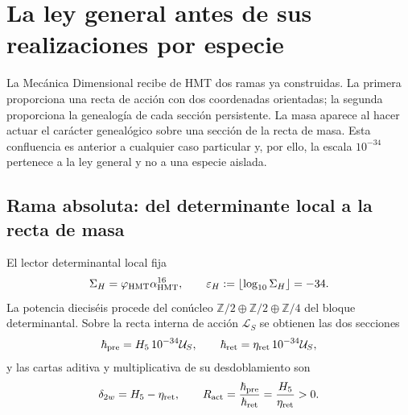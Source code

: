 \section{La ley general antes de sus realizaciones por especie}
\label{sec:ley-general-masa-accion-autonoma}

La Mecánica Dimensional recibe de HMT dos ramas ya construidas. La primera
proporciona una recta de acción con dos coordenadas orientadas; la segunda
proporciona la genealogía de cada sección persistente. La masa aparece al
hacer actuar el carácter genealógico sobre una sección de la recta de masa.
Esta confluencia es anterior a cualquier caso particular y, por ello, la
escala \(10^{-34}\) pertenece a la ley general y no a una especie aislada.

\subsection{Rama absoluta: del determinante local a la recta de masa}

El lector determinantal local fija
\begin{equation}
 \Sigma_H=\varphi_{\rm HMT}\alpha_{\rm HMT}^{16},
 \qquad \varepsilon_H:=\left\lfloor\log_{10}\Sigma_H\right\rfloor=-34 .
 \label{eq:ley-masa-sigma-menos34-autonoma}
\end{equation}
La potencia dieciséis procede del conúcleo
\(
 \mathbb Z/2\oplus\mathbb Z/2\oplus\mathbb Z/4
\)
del bloque determinantal. Sobre la recta interna de acción
\(\mathcal L_S\) se obtienen las dos secciones
\begin{equation}
 \boldsymbol\hbar_{\rm pre}
 =H_5\,10^{-34}\mathcal U_S,
 \qquad
 \boldsymbol\hbar_{\rm ret}
 =\eta_{\rm ret}\,10^{-34}\mathcal U_S,
 \label{eq:ley-masa-hbar-pre-ret-autonoma}
\end{equation}
y las cartas aditiva y multiplicativa de su desdoblamiento son
\begin{equation}
 \delta_{2w}=H_5-\eta_{\rm ret},
 \qquad
 R_{\rm act}
 =\frac{\boldsymbol\hbar_{\rm pre}}
        {\boldsymbol\hbar_{\rm ret}}
 =\frac{H_5}{\eta_{\rm ret}}>0 .
 \label{eq:ley-masa-razon-accion-autonoma}
\end{equation}

